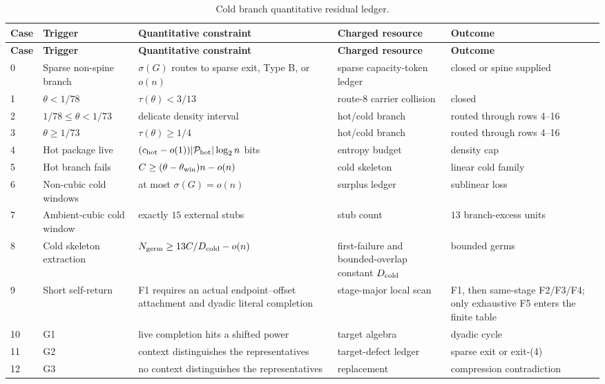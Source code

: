 \documentclass[11pt]{article}
\begin{document}
\begin{longtable}{C{0.05\textwidth} L{0.22\textwidth} L{0.22\textwidth} L{0.20\textwidth} L{0.21\textwidth}}
\caption{Cold branch quantitative residual ledger.}\label{tab:cold-branch-ledger}\\
\toprule
\textbf{Case} & \textbf{Trigger} & \textbf{Quantitative constraint} & \textbf{Charged resource} & \textbf{Outcome} \\
\midrule
\endfirsthead
\toprule
\textbf{Case} & \textbf{Trigger} & \textbf{Quantitative constraint} & \textbf{Charged resource} & \textbf{Outcome} \\
\midrule
{} & Sparse non-spine branch & \(\sigma(G)\) routes to sparse exit, Type B, or \(o(n)\) & sparse capacity-token ledger & closed or spine supplied \\
1 & \(\theta<1/78\) & \(\tau(\theta)<3/13\) & route-8 carrier collision & closed \\
2 & \(1/78\le\theta<1/73\) & delicate density interval & hot/cold branch & routed through rows 4--16 \\
3 & \(\theta\ge1/73\) & \(\tau(\theta)\ge1/4\) & hot/cold branch & routed through rows 4--16 \\
4 & Hot package live & \((c_{\rm hot}-o(1))|\mathcal P_{\rm hot}|\log_2 n\) bits & entropy budget & density cap \\
5 & Hot branch fails & \(C\ge(\theta-\theta_{\rm win})n-o(n)\) & cold skeleton & linear cold family \\
6 & Non-cubic cold windows & at most \(\sigma(G)=o(n)\) & surplus ledger & sublinear loss \\
7 & Ambient-cubic cold window & exactly \(15\) external stubs & stub count & \(13\) branch-excess units \\
8 & Cold skeleton extraction & \(N_{\rm germ}\ge13C/D_{\rm cold}-o(n)\) & first-failure and bounded-overlap constant \(D_{\rm cold}\) & bounded germs \\
9 & Short self-return & F1 requires an actual endpoint--offset attachment and dyadic literal completion & stage-major local scan & F1, then same-stage F2/F3/F4; only exhaustive F5 enters the finite table \\
10 & G1 & live completion hits a shifted power & target algebra & dyadic cycle \\
11 & G2 & context distinguishes the representatives & target-defect ledger & sparse exit or exit-\textup{(4)} \\
12 & G3 & no context distinguishes the representatives & replacement & compression contradiction \\

\end{longtable}
\end{document}
